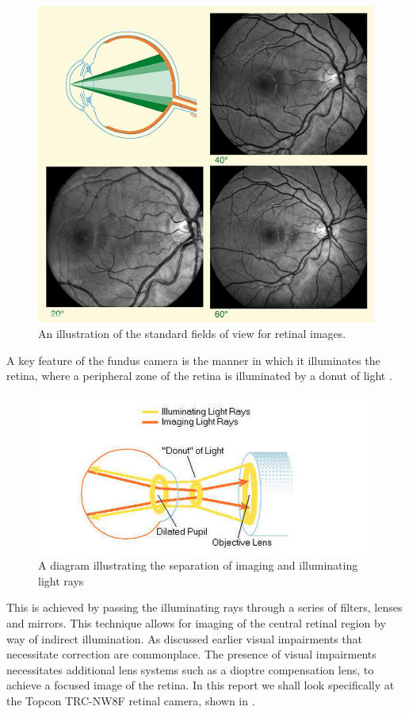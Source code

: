 \begin{figure}[htbp]
\centering
\includegraphics{figures/fieldofview}
\caption{An illustration of the standard fields of view for retinal images.}
\label{fig:fov}
\end{figure}

A key feature of the fundus camera is the manner in which it illuminates
the retina, where a peripheral zone of the retina is illuminated by a
donut of light .

\begin{figure}[htbp]
\centering
\includegraphics{figures/lightdonut}
\caption{A diagram illustrating the separation of imaging and illuminating light rays}
\label{fig:ld}
\end{figure}

This is achieved by passing the illuminating rays through a series
of filters, lenses and mirrors. This technique allows for imaging of the
central retinal region by way of indirect illumination. As discussed earlier
visual impairments that necessitate correction are commonplace.
The presence of visual impairments necessitates additional lens systems
such as a dioptre compensation lens, to achieve a focused image of the
retina. In this report we shall look specifically at the Topcon TRC-NW8F
retinal camera, shown in .

